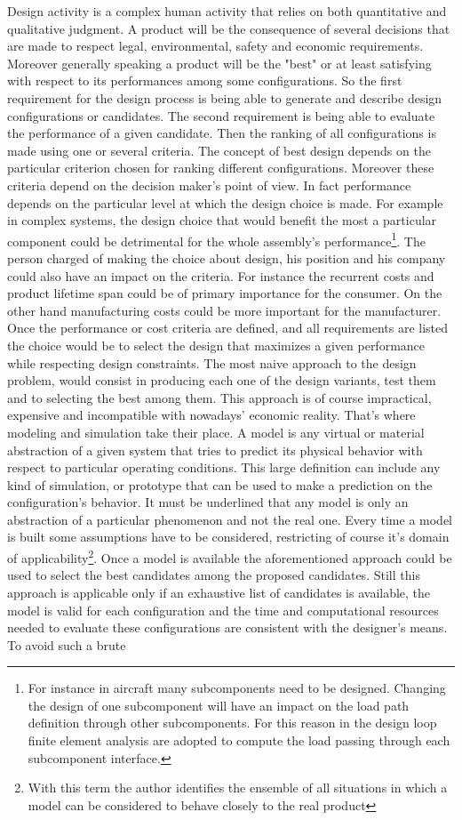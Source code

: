 Design activity is a complex human activity that relies on both quantitative and qualitative judgment. A product will be the consequence of several decisions that are made to respect legal, environmental, safety and economic requirements. Moreover generally speaking a product will be the "best" or at least satisfying with respect to its performances among some configurations.
So the first requirement for the design process is being able to generate and describe design configurations or candidates. The second requirement is being able to evaluate the performance of a given candidate. Then the ranking of all configurations is made using one or several criteria.
The concept of best design depends on the particular criterion chosen for ranking different configurations. Moreover these criteria depend on the decision maker's point of view. In fact performance depends on the particular level at which the design choice is made. For example in complex systems, the design choice that would benefit the most a particular component could be detrimental for the whole assembly's performance\footnote{For instance in aircraft many subcomponents need to be designed. Changing the design of one subcomponent will have an impact on the load path definition  through other subcomponents. For this reason in the design loop finite element analysis are adopted to compute the load passing through each subcomponent interface.}. The person charged of making the choice about design, his position and his company could also have an impact on the criteria. For instance the recurrent costs and product lifetime span could be of primary importance for the consumer. On the other hand manufacturing costs could be more important for the manufacturer. Once the performance or cost criteria are defined, and all requirements are listed the choice would be to select the design that maximizes a given performance while respecting design constraints. The most naive approach to the design problem, would consist in producing each one of the design variants, test them and to selecting the best among them. This approach is of course impractical, expensive and incompatible with nowadays' economic reality. That's where modeling and simulation take their place. A model is any virtual or material abstraction of a given system that tries to predict its physical behavior with respect to particular operating conditions. This large definition can include any kind of simulation, or prototype that can be used to make a prediction on the configuration's behavior. It must be underlined that any model is only an abstraction of a particular phenomenon and not the real one. Every time a model is built some assumptions have to be considered, restricting of course it's domain of applicability\footnote{With this term the author identifies the ensemble of all situations in which a model can be considered to behave closely to the real product}. Once a model is available the aforementioned approach could be used to select the best candidates among the proposed candidates. Still this approach is applicable only if an exhaustive list of candidates is available, the model is valid for each configuration and the time and computational resources needed to evaluate these configurations are consistent with the designer's means. To avoid such a brute 